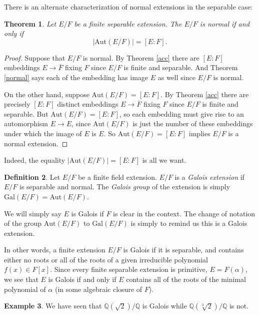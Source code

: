 \documentclass[12pt]{report}
\newtheorem{thm}{Theorem}[section]
\theoremstyle{definition}
\newtheorem{defn}[thm]{Definition}
\newtheorem{example}[thm]{Example}
\def\QQ{\mathbb{Q}}
\def\Aut{\text{Aut}}
\def\aa{\alpha}
\def\Gal{\text{Gal}}
\begin{document}
There is an alternate characterization of normal extensions in the separable case:

\begin{thm}\label{num1}
    Let $E/F$ be a finite separable extension. The $E/F$ is normal if and only if $$|\Aut(E/F)|=[E:F].$$
\end{thm}

\begin{proof}
    Suppose that $E/F$ is normal. By Theorem \ref{acc} there are $[E:F]$ embeddings $E\to \overline{F}$ fixing $F$ since $E/F$ is finite and separable. And Theorem \ref{normal} says each of the embedding has image $E$ as well since $E/F$ is normal.
    
    On the other hand, suppose $\Aut(E/F) = [E:F]$. By Theorem \ref{acc} there are precisely $[E:F]$ distinct embeddings $E\to \overline{F}$ fixing $F$ since $E/F$ is finite and separable. But $\Aut(E/F) = [E:F]$, so each embedding must give rise to an automorphism $E\to E$, since $\Aut(E/F)$ is just the number of these embeddings under which the image of $E$ is $E$. So $\Aut(E/F) = [E:F]$ implies $E/F$ is a normal extension.
\end{proof}

Indeed, the equality $|\Aut(E/F)|=[E:F]$ is all we want.

\begin{defn}
    Let $E/F$ be a finite field extension. $E/F$ is a \emph{Galois extension} if $E/F$ is separable and normal. The \emph{Galois group} of the extension is simply $\Gal(E/F)=\Aut(E/F)$.
\end{defn}

We will simply say $E$ is Galois if $F$ is clear in the context. The change of notation of the group $\Aut(E/F)$ to $\Gal(E/F)$ is simply to remind us this is a Galois extension.

In other words, a finite extension $E/F$ is Galois if it is separable, and contains either no roots or all of the roots of a given irreducible polynomial $f(x)\in F[x]$. Since every finite separable extension is primitive, $E = F(\aa)$, we see that $E$ is Galois if and only if $E$ contains all of the roots of the minimal polynomial of $\aa$ (in some algebraic closure of $F$).

\begin{example}
    We have seen that $\QQ(\sqrt{2})/\QQ$ is Galois while $\QQ(\sqrt[3]{2})/\QQ$ is not.
\end{example}
\end{document}
